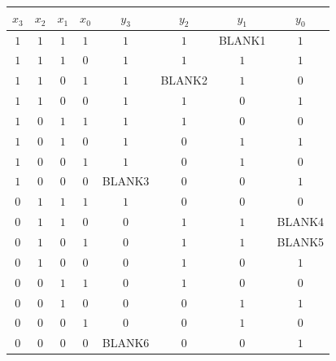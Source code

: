 \begin{enumerate}[labelindent=0pt, leftmargin=0pt]
\begin{enumerate}
        \begin{center}
        \begin{tabular}{cccc|cccc}
        $x_3$ & $x_2$ & $x_1$ & $x_0$ & $y_3$ & $y_2$ & $y_1$ & $y_0$\\
        \hline
        $1$ & $1$ & $1$ & $1$ & $1$ & $1$ & BLANK1 & $1$\\
        $1$ & $1$ & $1$ & $0$ & $1$ & $1$ & $1$ & $1$\\
        $1$ & $1$ & $0$ & $1$ & $1$ & BLANK2 & $1$ & $0$\\
        $1$ & $1$ & $0$ & $0$ & $1$ & $1$ & $0$ & $1$\\
        $1$ & $0$ & $1$ & $1$ & $1$ & $1$ & $0$ & $0$\\
        $1$ & $0$ & $1$ & $0$ & $1$ & $0$ & $1$ & $1$\\
        $1$ & $0$ & $0$ & $1$ & $1$ & $0$ & $1$ & $0$\\
        $1$ & $0$ & $0$ & $0$ & BLANK3& $0$ & $0$ & $1$\\
        $0$ & $1$ & $1$ & $1$ & $1$ & $0$ & $0$ & $0$\\
        $0$ & $1$ & $1$ & $0$ & $0$ & $1$ & $1$ & BLANK4\\
        $0$ & $1$ & $0$ & $1$ & $0$ & $1$ & $1$ & BLANK5\\
        $0$ & $1$ & $0$ & $0$ & $0$ & $1$ & $0$ & $1$\\
        $0$ & $0$ & $1$ & $1$ & $0$ & $1$ & $0$ & $0$\\
        $0$ & $0$ & $1$ & $0$ & $0$ & $0$ & $1$ & $1$\\
        $0$ & $0$ & $0$ & $1$ & $0$ & $0$ & $1$ & $0$\\
        $0$ & $0$ & $0$ & $0$ & BLANK6 & $0$ & $0$ & $1$\\
        \end{tabular}
        \end{center}
  

\end{enumerate}
\end{enumerate}
